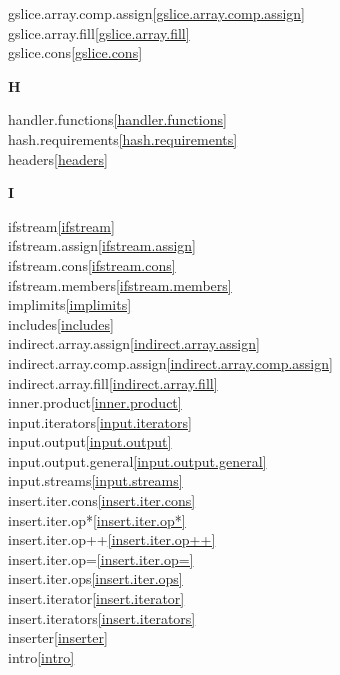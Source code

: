 \begin{multicols}{2}
gslice.array.comp.assign\quad\ref{gslice.array.comp.assign}\\
gslice.array.fill\quad\ref{gslice.array.fill}\\
gslice.cons\quad\ref{gslice.cons}\\
\par \textbf{H}\par
handler.functions\quad\ref{handler.functions}\\
hash.requirements\quad\ref{hash.requirements}\\
headers\quad\ref{headers}\\
\par \textbf{I}\par
ifstream\quad\ref{ifstream}\\
ifstream.assign\quad\ref{ifstream.assign}\\
ifstream.cons\quad\ref{ifstream.cons}\\
ifstream.members\quad\ref{ifstream.members}\\
implimits\quad\ref{implimits}\\
includes\quad\ref{includes}\\
indirect.array.assign\quad\ref{indirect.array.assign}\\
indirect.array.comp.assign\quad\ref{indirect.array.comp.assign}\\
indirect.array.fill\quad\ref{indirect.array.fill}\\
inner.product\quad\ref{inner.product}\\
input.iterators\quad\ref{input.iterators}\\
input.output\quad\ref{input.output}\\
input.output.general\quad\ref{input.output.general}\\
input.streams\quad\ref{input.streams}\\
insert.iter.cons\quad\ref{insert.iter.cons}\\
insert.iter.op*\quad\ref{insert.iter.op*}\\
insert.iter.op++\quad\ref{insert.iter.op++}\\
insert.iter.op=\quad\ref{insert.iter.op=}\\
insert.iter.ops\quad\ref{insert.iter.ops}\\
insert.iterator\quad\ref{insert.iterator}\\
insert.iterators\quad\ref{insert.iterators}\\
inserter\quad\ref{inserter}\\
intro\quad\ref{intro}\\

\end{multicols}
